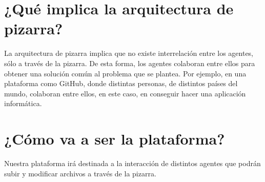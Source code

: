 \section{¿Qué implica la arquitectura de pizarra?}
La arquitectura de pizarra implica que no existe interrelación entre los agentes, sólo a través de la pizarra. De esta forma, los agentes colaboran entre ellos para obtener una solución común al problema que se plantea. Por ejemplo, en una plataforma como GitHub, donde distintas personas, de distintos países del mundo, colaboran entre ellos, en este caso, en conseguir hacer una aplicación informática. 

\section{¿Cómo va a ser la plataforma?}
Nuestra plataforma irá destinada a la interacción de distintos agentes que podrán subir y modificar archivos a través de la pizarra.


